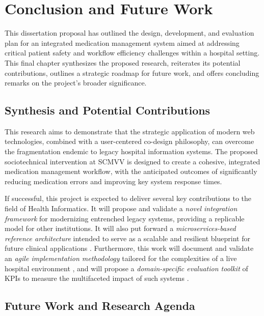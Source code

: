 \chapter{Conclusion and Future Work}

\label{chap:ConclusionsAndFutureWork}

This dissertation proposal has outlined the design, development, and evaluation plan for an integrated medication management system aimed at addressing critical patient safety and workflow efficiency challenges within a hospital setting. This final chapter synthesizes the proposed research, reiterates its potential contributions, outlines a strategic roadmap for future work, and offers concluding remarks on the project's broader significance.

\section{Synthesis and Potential Contributions}

This research aims to demonstrate that the strategic application of modern web technologies, combined with a user-centered co-design philosophy, can overcome the fragmentation endemic to legacy hospital information systems. The proposed sociotechnical intervention at SCMVV is designed to create a cohesive, integrated medication management workflow, with the anticipated outcomes of significantly reducing medication errors and improving key system response times.

If successful, this project is expected to deliver several key contributions to the field of Health Informatics. It will propose and validate a \textit{novel integration framework} for modernizing entrenched legacy systems, providing a replicable model for other institutions. It will also put forward a \textit{microservices-based reference architecture} intended to serve as a scalable and resilient blueprint for future clinical applications \cite{newman2021}. Furthermore, this work will document and validate an \textit{agile implementation methodology} tailored for the complexities of a live hospital environment \cite{may2013}, and will propose a \textit{domain-specific evaluation toolkit} of KPIs to measure the multifaceted impact of such systems \cite{donabedian1988}.

\section{Future Work and Research Agenda}

